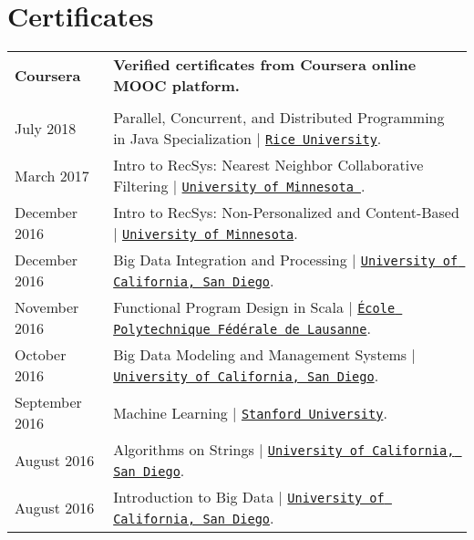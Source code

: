 \documentclass[letterpaper]{article}
\begin{document}
{{{\section*{Certificates}

{\renewcommand{\arraystretch}{1.2}
\begin{tabular}{l l}
\textbf{Coursera} & \textbf{Verified certificates from Coursera online MOOC platform.}
\\
\\
July 2018 &  Parallel, Concurrent, and Distributed Programming in Java Specialization |  \href{https://www.coursera.org/account/accomplishments/specialization/7XPLLTAAT4TG}{\tt Rice University}.
\\
March 2017 &  Intro to RecSys: Nearest Neighbor Collaborative Filtering                                               |  \href{https://www.coursera.org/account/accomplishments/verify/PZNSF9HR2TS4}{\tt University of Minnesota }.
\\
December 2016 & Intro to RecSys: Non-Personalized and Content-Based  |  \href{https://www.coursera.org/account/accomplishments/verify/DUQNZMH9CU7W}{\tt University of Minnesota}.
\\
December 2016 & Big Data Integration and Processing |  \href{https://www.coursera.org/account/accomplishments/verify/4GGUNARB9MBQ}{\tt University of California, San Diego}.
\\
November 2016 & Functional Program Design in Scala |  \href{https://www.coursera.org/account/accomplishments/certificate/LNSNRHKK4K44}{\tt École Polytechnique Fédérale de Lausanne}.
\\
October 2016 &  Big Data Modeling and Management Systems |  \href{https://www.coursera.org/account/accomplishments/certificate/NDLW93FX3U99}{\tt University of California, San Diego}.
\\
September 2016 & Machine Learning                                                                                                  |  \href{https://www.coursera.org/account/accomplishments/certificate/JE788VNJ6TKS}{\tt Stanford University}.
\\
August 2016 & Algorithms on Strings |  \href{https://www.coursera.org/account/accomplishments/certificate/ZALUCS3TDQTD}{\tt University of California, San Diego}.
\\
August 2016 & Introduction to Big Data                                                               |  \href{https://www.coursera.org/account/accomplishments/certificate/XE3LV3RG2THG}{\tt University of California, San Diego}.

\end{tabular}}}}}
\end{document}
